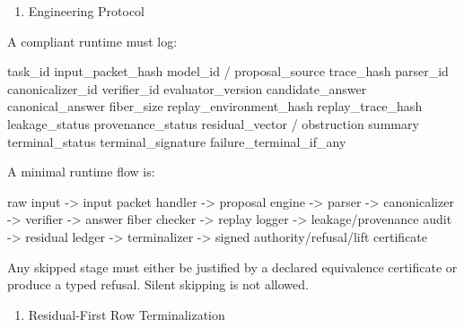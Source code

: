 \documentclass[
  10pt,
]{article}
\newenvironment{Shaded}{}{}
\newcommand{\NormalTok}[1]{#1}
\providecommand{\tightlist}{%
  \setlength{\itemsep}{0pt}\setlength{\parskip}{0pt}}
\providecommand{\tightlist}{%
  \setlength{\itemsep}{0pt}\setlength{\parskip}{0pt}}
\begin{document}
\begin{enumerate}
\def\labelenumi{\arabic{enumi}.}
\setcounter{enumi}{16}
\tightlist
\item
  Engineering Protocol
\end{enumerate}

A compliant runtime must log:

\begin{Shaded}
\begin{Highlighting}[]
\NormalTok{task\_id}
\NormalTok{input\_packet\_hash}
\NormalTok{model\_id / proposal\_source}
\NormalTok{trace\_hash}
\NormalTok{parser\_id}
\NormalTok{canonicalizer\_id}
\NormalTok{verifier\_id}
\NormalTok{evaluator\_version}
\NormalTok{candidate\_answer}
\NormalTok{canonical\_answer}
\NormalTok{fiber\_size}
\NormalTok{replay\_environment\_hash}
\NormalTok{replay\_trace\_hash}
\NormalTok{leakage\_status}
\NormalTok{provenance\_status}
\NormalTok{residual\_vector / obstruction summary}
\NormalTok{terminal\_status}
\NormalTok{terminal\_signature}
\NormalTok{failure\_terminal\_if\_any}
\end{Highlighting}
\end{Shaded}

A minimal runtime flow is:

\begin{Shaded}
\begin{Highlighting}[]
\NormalTok{raw input}
\NormalTok{  {-}\textgreater{} input packet handler}
\NormalTok{  {-}\textgreater{} proposal engine}
\NormalTok{  {-}\textgreater{} parser}
\NormalTok{  {-}\textgreater{} canonicalizer}
\NormalTok{  {-}\textgreater{} verifier}
\NormalTok{  {-}\textgreater{} answer fiber checker}
\NormalTok{  {-}\textgreater{} replay logger}
\NormalTok{  {-}\textgreater{} leakage/provenance audit}
\NormalTok{  {-}\textgreater{} residual ledger}
\NormalTok{  {-}\textgreater{} terminalizer}
\NormalTok{  {-}\textgreater{} signed authority/refusal/lift certificate}
\end{Highlighting}
\end{Shaded}

Any skipped stage must either be justified by a declared equivalence certificate or produce a typed refusal. Silent skipping is not allowed.

\begin{enumerate}
\def\labelenumi{\arabic{enumi}.}
\setcounter{enumi}{17}
\tightlist
\item
  Residual-First Row Terminalization
\end{enumerate}
\end{document}
